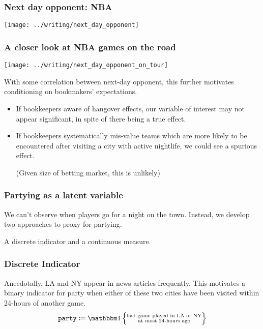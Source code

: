 \documentclass{beamer}
\begin{document}
\begin{frame}   \frametitle{Next day opponent: NBA}
  \centering \texttt{[image: ../writing/next\_day\_opponent]} \end{frame}

\begin{frame}   \frametitle{A closer look at NBA games on the road}
  \centering \texttt{[image: ../writing/next\_day\_opponent\_on\_tour]} \end{frame}

\begin{frame}   %
  \begin{block}{With some correlation between next-day opponent, this further motivates conditioning
  on bookmakers' expectations.}
  \begin{itemize}     \item If bookkeepers aware of hangover effects, our variable of interest may not appear significant, in spite of there being a true effect.

    \item If bookkeepers systematically mis-value teams which are more likely to be encountered after visiting a city with active nightlife, we could see a spurious effect.

      (Given size of betting market, this is unlikely)
    \end{itemize}   \end{block}
\end{frame}

\begin{frame}   \frametitle{Partying as a latent variable}
  \begin{block}{We can't observe when players go for a night on the town.}
    Instead, we develop two approaches to proxy for partying. 

    A discrete indicator and a continuous measure.
  \end{block} \end{frame}

\begin{frame}   \frametitle{Discrete Indicator}
  \begin{block}{Anecdotally, LA and NY appear in news articles frequently.}     \vspace{12pt}This motivates a binary indicator for party when either of these two cities have been visited within 24-hours of another game.
\vspace{12pt}
    \[
      \texttt{party} \coloneqq \mathbbm 1 \left \{\substack{\textrm{last game played in LA or NY} \\ \textrm{at most 24-hours ago}}\right \}
    \]   \end{block} \end{frame}
\end{document}
